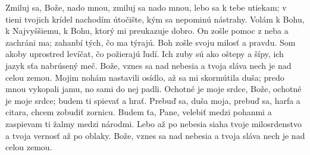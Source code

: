 Zmiluj sa, Bože, nado mnou, zmiluj sa nado mnou,
lebo sa k tebe utiekam;
\versseparator
v tieni tvojich krídel nachodím útočište,
kým sa nepominú nástrahy.
\versseparator
Volám k Bohu, k Najvyššiemu,
k Bohu, ktorý mi preukazuje dobro.
\versseparator
On zošle pomoc z neba a zachráni ma;
zahanbí tých, čo ma týrajú.
\versseparator
Boh zošle svoju milosť a pravdu.
Som akoby uprostred levíčat,
čo požierajú ľudí.
\versseparator
Ich zuby sú ako oštepy a šípy,
ich jazyk sťa nabrúsený meč.
\versseparator
Bože, vznes sa nad nebesia
a tvoja sláva nech je nad celou zemou.
\versseparator
Mojim nohám nastavili osídlo,
až sa mi skormútila duša;
\versseparator
predo mnou vykopali jamu,
no sami do nej padli.
\versseparator
Ochotné je moje srdce, Bože,
ochotné je moje srdce;
budem ti spievať a hrať.
\versseparator
Prebuď sa, duša moja,
prebuď sa, harfa a citara,
chcem zobudiť zornicu.
\versseparator
Budem ťa, Pane, velebiť medzi pohanmi
a zaspievam ti žalmy medzi národmi.
\versseparator
Lebo až po nebesia siaha tvoje milosrdenstvo
a tvoja vernosť až po oblaky.
\versseparator
Bože, vznes sa nad nebesia
a tvoja sláva nech je nad celou zemou.